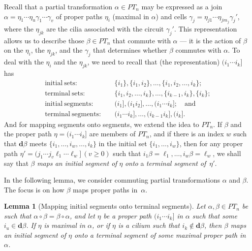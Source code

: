 \documentclass{surv-l}
\numberwithin{equation}{section}
\numberwithin{table}{section}
\numberwithin{figure}{section}
\theoremstyle{plain}
\newtheorem{lemma}[equation]{Lemma}
\theoremstyle{definition}
\begin{document}
Recall that a partial transformation $\alpha\in PT_{n}$ may be
expressed as a join
$\alpha=\eta_{1}\cdots\eta_{u}\gamma_{1}\cdots\gamma_{v}$ of
proper paths $\eta_{i}$ (maximal in $\alpha$) and cells
$\gamma_{j}= \eta_{j1}\cdots\eta_{jm_{j}}\gamma_{j}'$, where the
$\eta_{jk}$ are the cilia associated with the circuit
$\gamma_{j}'$. This representation allows us to describe those
$\beta\in PT_{n}$ that commute with $\alpha$ --- it is the action of
$\beta$ on the $\eta_{i}$, the $\eta_{jk}$, and the $\gamma_{j}$
that determines whether $\beta$ commutes with $\alpha$. To deal
with the $\eta_{i}$ and the $\eta_{jk}$, we need to recall that
(the representation) $(i_{1}\cdots i_{k}]$ has
\begin{align*}
\mathrm{initial\ sets}{:}\quad &\{i_{1}\}, \{i_{1}, i_{2}\},\ldots, \{i_{1}, i_{2},\ldots, i_{k}\};\\
\mathrm{terminal\ sets}{:}\quad &\{i_{1}, i_{2},\ldots,i_{k}\}, \ldots, \{i_{k-1}, i_{k}\}, \{i_{k}\};\\
\mathrm{initial\ segments}{:}\quad &(i_{1}], (i_{1}i_{2}],\ldots, (i_{1}\cdots i_{k}];\quad \mathrm{and} \\
\mathrm{terminal\ segments}{:}\quad &(i_{1}\cdots i_{k}],\ldots, (i_{k-1}i_{k}], (i_{k}].
\end{align*}
And for mapping segments onto segments, we extend the idea to
$PT_{n}$. If $\beta$ and the proper path $\eta=(i_{1}\cdots
i_{k}]$ are members of $PT_{n}$, and if there is an index $w$ such
that $\mathbf{d}\beta$ meets $\{i_{1},\ldots, i_{w},\ldots,
i_{k}\}$ in the initial set $\{i_{1},\ldots, i_{w}\}$, then for
any proper path $\eta'=(j_{1}\cdots j_{v}\ell_{1}\cdots
\ell_{w}]\,(v\geq 0)$ such that
$i_{1}\beta=\ell_{1},\ldots,i_{w}\beta=\ell_{w}$, we shall say
that $\beta$ \emph{maps an initial segment of} $\eta$ \emph{onto}
a \emph{terminal segment of}~$\eta'$.

In the following lemma, we consider commuting partial
transformations $\alpha$ and $\beta$. The focus is on how $\beta$
maps proper paths in~$\alpha$.

\begin{lemma}[Mapping initial segments onto terminal
segments]\label{lem12.58.1} Let $\alpha,\beta\in PT_{n}$ be such
that $\alpha \circ\beta=\beta \circ\alpha$, and let $\eta$ be a
proper path $(i_{1}\cdots i_{k}]$ in $\alpha$ such that some
$i_{u}\in \mathbf{d}\beta$. If $\eta$ is maximal in $\alpha$, or
if $\eta$ is a cilium such that $i_{k}\not\in \mathbf{d}\beta$,
then $\beta$ maps an initial segment of $\eta$ onto a terminal
segment of some maximal proper path in~$\alpha$.
\end{lemma}
\end{document}
